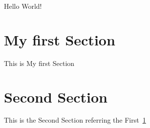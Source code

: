 \documentclass{article}
\begin{document}
  Hello World!

  \section{My first Section}
  \label{sec:mfs}


  This is My first Section



  \section{Second Section}
  \label{sec:ss}


  This is the Second Section referring the First~\ref{sec:mfs}
\end{document}
